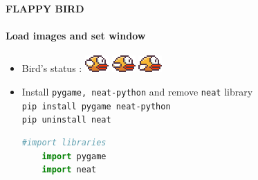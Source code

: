 \documentclass[10pt]{beamer}
\begin{document}
{
%
\begin{frame}[fragile]{\textbf{FLAPPY BIRD}}
    \framesubtitle{\textbf{Load images and set window}}
    \begin{minipage}{0.65\textwidth}
        \begin{itemize}
            \item  Bird's status : \includegraphics[scale=0.7]{bird1.png} \includegraphics[scale=0.7]{bird2.png} \includegraphics[scale=0.7]{bird3.png}
            \pause 
            \item  Install \texttt{pygame, neat-python} and remove \texttt{neat} library\\
            \texttt{pip install pygame neat-python}\\
            \texttt{pip uninstall neat}
            \begin{lstlisting}[language=Python]
        #import libraries
    import pygame
    import neat
            \end{lstlisting}
        \end{itemize}
        \vspace{2cm}
    \end{minipage}
    \begin{minipage}{0.25\textwidth}

\end{minipage}
\end{frame}}
\end{document}
